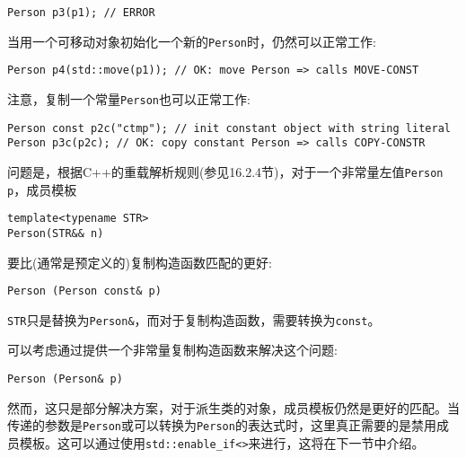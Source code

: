 \begin{lstlisting}[style=styleCXX]
Person p3(p1); // ERROR
\end{lstlisting}

当用一个可移动对象初始化一个新的\texttt{Person}时，仍然可以正常工作:

\begin{lstlisting}[style=styleCXX]
Person p4(std::move(p1)); // OK: move Person => calls MOVE-CONST
\end{lstlisting}

注意，复制一个常量\texttt{Person}也可以正常工作:

\begin{lstlisting}[style=styleCXX]
Person const p2c("ctmp"); // init constant object with string literal
Person p3c(p2c); // OK: copy constant Person => calls COPY-CONSTR
\end{lstlisting}

问题是，根据C++的重载解析规则(参见16.2.4节)，对于一个非常量左值\texttt{Person p}，成员模板

\begin{lstlisting}[style=styleCXX]
template<typename STR>
Person(STR&& n)
\end{lstlisting}

要比(通常是预定义的)复制构造函数匹配的更好:

\begin{lstlisting}[style=styleCXX]
Person (Person const& p)
\end{lstlisting}

\texttt{STR}只是替换为\texttt{Person\&}，而对于复制构造函数，需要转换为\texttt{const}。

可以考虑通过提供一个非常量复制构造函数来解决这个问题:

\begin{lstlisting}[style=styleCXX]
Person (Person& p)
\end{lstlisting}

然而，这只是部分解决方案，对于派生类的对象，成员模板仍然是更好的匹配。当传递的参数是\texttt{Person}或可以转换为\texttt{Person}的表达式时，这里真正需要的是禁用成员模板。这可以通过使用\texttt{std::enable\_if<>}来进行，这将在下一节中介绍。

































